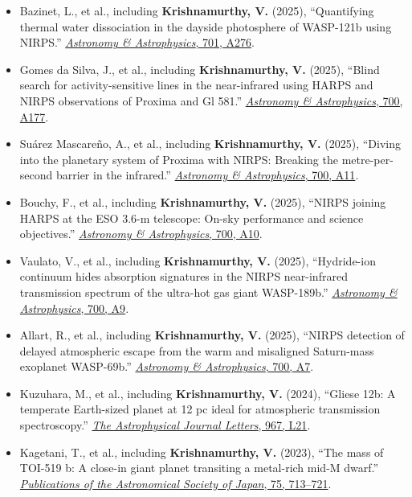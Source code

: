 \documentclass[10pt,a4paper]{article}
\begin{document}
\begin{itemize}
\item
Bazinet, L., et al., including \textbf{Krishnamurthy, V.} (2025),
``Quantifying thermal water dissociation in the dayside photosphere
of WASP-121b using NIRPS.''
\href{https://doi.org/10.1051/0004-6361/202553724}
{\emph{Astronomy \& Astrophysics}, 701, A276}.

\item
Gomes da Silva, J., et al., including \textbf{Krishnamurthy, V.} (2025),
``Blind search for activity-sensitive lines in the near-infrared using
HARPS and NIRPS observations of Proxima and Gl 581.''
\href{https://doi.org/10.1051/0004-6361/202555013}
{\emph{Astronomy \& Astrophysics}, 700, A177}.

\item
Suárez Mascareño, A., et al., including
\textbf{Krishnamurthy, V.} (2025),
``Diving into the planetary system of Proxima with NIRPS:
Breaking the metre-per-second barrier in the infrared.''
\href{https://doi.org/10.1051/0004-6361/202553728}
{\emph{Astronomy \& Astrophysics}, 700, A11}.

\item
Bouchy, F., et al., including \textbf{Krishnamurthy, V.} (2025),
``NIRPS joining HARPS at the ESO 3.6-m telescope:
On-sky performance and science objectives.''
\href{https://doi.org/10.1051/0004-6361/202453341}
{\emph{Astronomy \& Astrophysics}, 700, A10}.

\item
Vaulato, V., et al., including \textbf{Krishnamurthy, V.} (2025),
``Hydride-ion continuum hides absorption signatures in the NIRPS
near-infrared transmission spectrum of the ultra-hot gas giant WASP-189b.''
\href{https://doi.org/10.1051/0004-6361/202452972}
{\emph{Astronomy \& Astrophysics}, 700, A9}.

\item
Allart, R., et al., including \textbf{Krishnamurthy, V.} (2025),
``NIRPS detection of delayed atmospheric escape from the warm and
misaligned Saturn-mass exoplanet WASP-69b.''
\href{https://doi.org/10.1051/0004-6361/202452525}
{\emph{Astronomy \& Astrophysics}, 700, A7}.

\item
Kuzuhara, M., et al., including \textbf{Krishnamurthy, V.} (2024),
``Gliese 12b: A temperate Earth-sized planet at 12 pc ideal for
atmospheric transmission spectroscopy.''
\href{https://doi.org/10.3847/2041-8213/ad3642}
{\emph{The Astrophysical Journal Letters}, 967, L21}.

\item
Kagetani, T., et al., including \textbf{Krishnamurthy, V.} (2023),
``The mass of TOI-519 b: A close-in giant planet transiting a
metal-rich mid-M dwarf.''
\href{https://doi.org/10.1093/pasj/psad031}
{\emph{Publications of the Astronomical Society of Japan}, 75, 713--721}.


\end{itemize}
\end{document}
